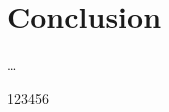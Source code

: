 \documentclass[12pt]{article}
\begin{document}
\section{Conclusion}
\ldots

123456

\newpage
\begin{footnotesize} %
\singlespacing %

\setlength{\bibsep}{5pt} %
\thispagestyle{empty} %
\end{footnotesize} %
\end{document}
